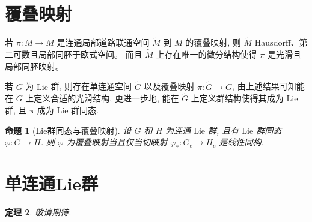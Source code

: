 \documentclass{book}
\newtheorem{theorem}{\indent 定理}[section]
\newtheorem{proposition}[theorem]{\indent 命题}
\begin{document}
    \section{覆叠映射}

        若 $\pi:\tilde{M}\rightarrow M$ 是连通局部道路联通空间 $\tilde{M}$ 到 $M$ 的覆叠映射, 则 $\tilde{M}$ $\mathrm{Hausdorff}$、第二可数且局部同胚于欧式空间。
        而且 $\tilde{M}$ 上存在唯一的微分结构使得 $\pi$ 是光滑且局部同胚映射。

        若 $G$ 为 $\mathrm{Lie}$ 群, 则存在单连通空间 $\tilde{G}$ 以及覆叠映射 $\pi:\tilde{G}\rightarrow G$, 由上述结果可知能在 $\tilde{G}$ 上定义合适的光滑结构,
        更进一步地, 能在 $\tilde{G}$ 上定义群结构使得其成为 $\mathrm{Lie}$ 群, 且 $\pi$ 成为 $\mathrm{Lie}$ 群同态.

        \begin{proposition}[Lie群同态与覆叠映射]
            设 $G$ 和 $H$ 为连通 $\mathrm{Lie}$ 群, 且有 $\mathrm{Lie}$ 群同态 $\varphi:G\rightarrow H$.
            则 $\varphi$ 为覆叠映射当且仅当切映射 $\varphi_*:G_e\rightarrow H_e$ 是线性同构.
        \end{proposition}

    \section{单连通Lie群}
        \begin{theorem}
            敬请期待.
        \end{theorem}
\end{document}
